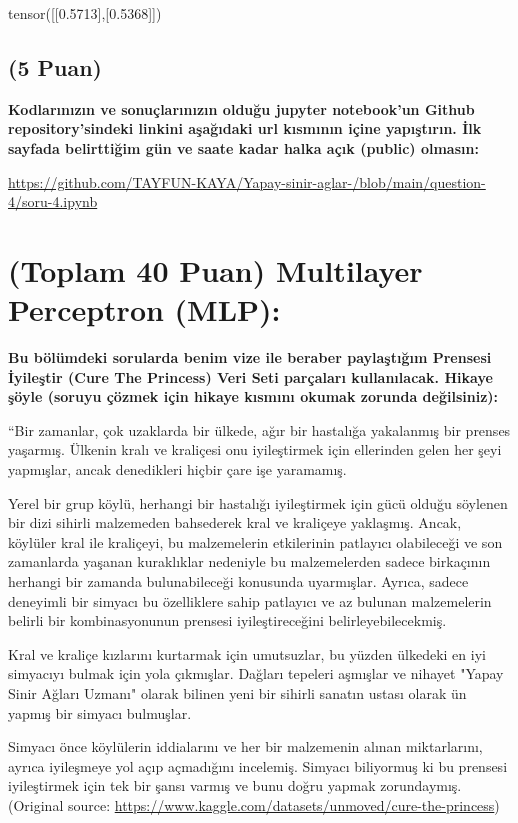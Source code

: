 \documentclass[11pt]{article}
\begin{document}
tensor([[0.5713],[0.5368]])

\subsection{(5 Puan)} \textbf{Kodlarınızın ve sonuçlarınızın olduğu jupyter notebook'un Github repository'sindeki linkini aşağıdaki url kısmının içine yapıştırın. İlk sayfada belirttiğim gün ve saate kadar halka açık (public) olmasın:}

\url{https://github.com/TAYFUN-KAYA/Yapay-sinir-aglar-/blob/main/question-4/soru-4.ipynb}

\section{(Toplam 40 Puan) Multilayer Perceptron (MLP):} 
\textbf{Bu bölümdeki sorularda benim vize ile beraber paylaştığım Prensesi İyileştir (Cure The Princess) Veri Seti parçaları kullanılacak. Hikaye şöyle (soruyu çözmek için hikaye kısmını okumak zorunda değilsiniz):} 

``Bir zamanlar, çok uzaklarda bir ülkede, ağır bir hastalığa yakalanmış bir prenses yaşarmış. Ülkenin kralı ve kraliçesi onu iyileştirmek için ellerinden gelen her şeyi yapmışlar, ancak denedikleri hiçbir çare işe yaramamış.

Yerel bir grup köylü, herhangi bir hastalığı iyileştirmek için gücü olduğu söylenen bir dizi sihirli malzemeden bahsederek kral ve kraliçeye yaklaşmış. Ancak, köylüler kral ile kraliçeyi, bu malzemelerin etkilerinin patlayıcı olabileceği ve son zamanlarda yaşanan kuraklıklar nedeniyle bu malzemelerden sadece birkaçının herhangi bir zamanda bulunabileceği konusunda uyarmışlar. Ayrıca, sadece deneyimli bir simyacı bu özelliklere sahip patlayıcı ve az bulunan malzemelerin belirli bir kombinasyonunun prensesi iyileştireceğini belirleyebilecekmiş.

Kral ve kraliçe kızlarını kurtarmak için umutsuzlar, bu yüzden ülkedeki en iyi simyacıyı bulmak için yola çıkmışlar. Dağları tepeleri aşmışlar ve nihayet "Yapay Sinir Ağları Uzmanı" olarak bilinen yeni bir sihirli sanatın ustası olarak ün yapmış bir simyacı bulmuşlar.

Simyacı önce köylülerin iddialarını ve her bir malzemenin alınan miktarlarını, ayrıca iyileşmeye yol açıp açmadığını incelemiş. Simyacı biliyormuş ki bu prensesi iyileştirmek için tek bir şansı varmış ve bunu doğru yapmak zorundaymış. (Original source: \url{https://www.kaggle.com/datasets/unmoved/cure-the-princess})
\end{document}
